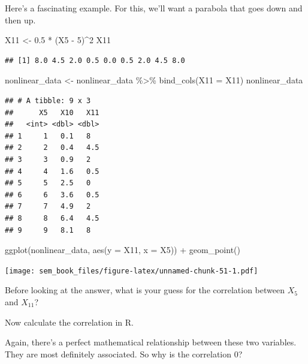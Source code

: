 \documentclass[
]{book}
\newenvironment{Shaded}{\begin{snugshade}}{\end{snugshade}}
\newcommand{\AttributeTok}[1]{\textcolor[rgb]{0.77,0.63,0.00}{#1}}
\newcommand{\DecValTok}[1]{\textcolor[rgb]{0.00,0.00,0.81}{#1}}
\newcommand{\FloatTok}[1]{\textcolor[rgb]{0.00,0.00,0.81}{#1}}
\newcommand{\FunctionTok}[1]{\textcolor[rgb]{0.00,0.00,0.00}{#1}}
\newcommand{\NormalTok}[1]{#1}
\newcommand{\OtherTok}[1]{\textcolor[rgb]{0.56,0.35,0.01}{#1}}
\newcommand{\SpecialCharTok}[1]{\textcolor[rgb]{0.00,0.00,0.00}{#1}}
\begin{document}
Here's a fascinating example. For this, we'll want a parabola that goes down and then up.

\begin{Shaded}
\begin{Highlighting}[]
\NormalTok{X11 }\OtherTok{\textless{}{-}} \FloatTok{0.5} \SpecialCharTok{*}\NormalTok{ (X5 }\SpecialCharTok{{-}} \DecValTok{5}\NormalTok{)}\SpecialCharTok{\^{}}\DecValTok{2}
\NormalTok{X11}
\end{Highlighting}
\end{Shaded}

\begin{verbatim}
## [1] 8.0 4.5 2.0 0.5 0.0 0.5 2.0 4.5 8.0
\end{verbatim}

\begin{Shaded}
\begin{Highlighting}[]
\NormalTok{nonlinear\_data }\OtherTok{\textless{}{-}}\NormalTok{ nonlinear\_data }\SpecialCharTok{\%\textgreater{}\%}
    \FunctionTok{bind\_cols}\NormalTok{(}\AttributeTok{X11 =}\NormalTok{ X11)}
\NormalTok{nonlinear\_data}
\end{Highlighting}
\end{Shaded}

\begin{verbatim}
## # A tibble: 9 x 3
##      X5   X10   X11
##   <int> <dbl> <dbl>
## 1     1   0.1   8  
## 2     2   0.4   4.5
## 3     3   0.9   2  
## 4     4   1.6   0.5
## 5     5   2.5   0  
## 6     6   3.6   0.5
## 7     7   4.9   2  
## 8     8   6.4   4.5
## 9     9   8.1   8
\end{verbatim}

\begin{Shaded}
\begin{Highlighting}[]
\FunctionTok{ggplot}\NormalTok{(nonlinear\_data, }\FunctionTok{aes}\NormalTok{(}\AttributeTok{y =}\NormalTok{ X11, }\AttributeTok{x =}\NormalTok{ X5)) }\SpecialCharTok{+}
    \FunctionTok{geom\_point}\NormalTok{()}
\end{Highlighting}
\end{Shaded}

\texttt{[image: sem\_book\_files/figure-latex/unnamed-chunk-51-1.pdf]}

Before looking at the answer, what is your guess for the correlation between \(X_{5}\) and \(X_{11}\)?

Now calculate the correlation in R.

Again, there's a perfect mathematical relationship between these two variables. They are most definitely associated. So why is the correlation 0?
\end{document}
